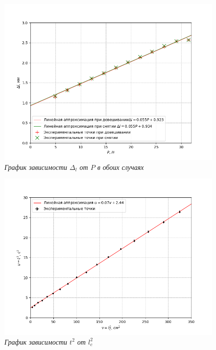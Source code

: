 \documentclass[a4paper,12pt]{article}
\begin{document}
\begin{figure}[h!]
    \includegraphics[width=1\textwidth]{graph-combined.png}
    \caption{\textit{График зависимости $\Delta_l$ от $P$ в обоих случаях}}
    \label{graph-combined}
\end{figure}

\begin{figure}[h!]
    \includegraphics[width=1\textwidth]{graph.png}
    \caption{\textit{График зависимости $t^2$ от $l_c^2$}}
    \label{graph}
\end{figure}
\end{document}
